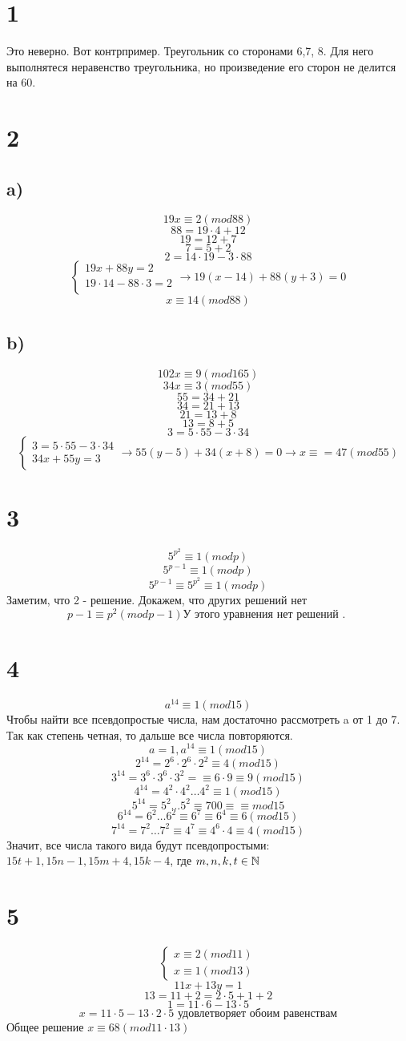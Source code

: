 

	\section*{1}
	Это неверно. Вот контрпример. Треугольник со сторонами 6,7, 8. Для него выполнятеся неравенство треугольника, но произведение его сторон не делится на 60.
	\section*{2}
	\subsection*{a)}
		$$19x \equiv 2( mod 88)$$
		$$88 = 19\cdot4 + 12 $$
		$$19 = 12+7$$ 
		$$7 = 5 + 2 $$
		$$2 = 14\cdot19 - 3\cdot88$$
		$$\begin{cases}
			19x+88y = 2 \\
			19\cdot14-88\cdot3 = 2 \\
		\end{cases}\to 19(x-14) + 88(y+3) = 0$$
		$$x \equiv 14 (mod 88)$$
		\subsection*{b)}
				$$102x \equiv 9( mod 165)$$
				$$34x \equiv 3(mod 55)$$
	$$55 = 34 + 21 $$
	$$34 = 21+13$$
	$$21 = 13+ 8$$
	$$13 = 8 + 5$$
	$$3 = 5\cdot55 - 3\cdot 34$$
	$$\begin{cases}3 = 5\cdot55 - 3\cdot 34\\
	34x + 55y= 3\end{cases}\to 55(y-5) +34(x+8) = 0\to x \equiv = 47(mod 55)$$
	\section*{3}
	$$5^{p^2} \equiv1(mod p)$$
	$$5^{p-1} \equiv1(mod p)$$
	$$ 5^{p-1}\equiv5^{p^2} \equiv1(mod p)$$
	 Заметим, что 2 - решение.
	 Докажем, что других решений нет
	$$p-1\equiv  p^2 (mod p-1)\text{У этого уравнения нет решений . }$$
\section*{4}
$$a^{14} \equiv 1(mod15)$$
Чтобы найти все псевдопростые числа, нам достаточно рассмотреть a от 1 до 7. Так как степень четная, то дальше все числа повторяются. 
$$a = 1, a^{14} \equiv1 (mod15)$$
$$2^{14} = 2^6\cdot 2^6 \cdot 2^2 \equiv4 (mod15)$$
$$3^{14} = 3^6\cdot 3^6\cdot 3^2 =\equiv 6\cdot9 \equiv9(mod 15)$$
$$4^{14} = 4^2\cdot 4^2 \dots 4^2 \equiv 1 (mod15)$$
$$5^{14} = 5^2 \dots 5^2 \equiv 700\equiv \equiv mod 15$$
$$6^{14} = 6^2\dots 6^2 \equiv 6^7\equiv6^4\equiv6 (mod15)$$
$$7^{14} = 7^2 \dots 7^2 \equiv 4^7\equiv4^6\cdot 4 \equiv 4(mod 15)$$
Значит, все числа такого вида будут псевдопростыми: $15t + 1, 15n-1, 15m+4,15k-4$, где $m,n,k,t \in \mathbb{N}$
\section*{5}
$$\begin{cases}
	x\equiv 2(mod 11)\\
	x\equiv1 (mod13)
\end{cases}$$
$$11x+13y = 1$$
$$13 = 11+ 2  = 2\cdot5+ 1+ 2$$
$$1 = 11\cdot6 - 13\cdot5$$
$$x =  11\cdot5 -13\cdot2\cdot5\text{ удовлетворяет обоим равенствам}$$ 
Общее решение $x\equiv 68(mod11\cdot13)$

